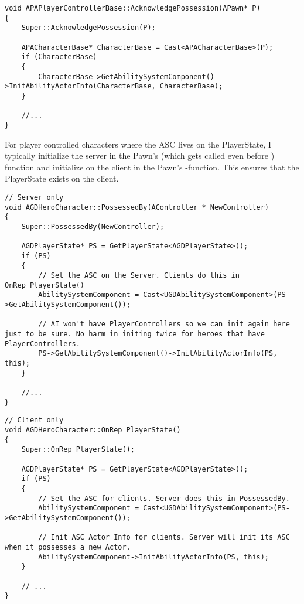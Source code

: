         \begin{lstlisting}
void APAPlayerControllerBase::AcknowledgePossession(APawn* P)
{
    Super::AcknowledgePossession(P);

    APACharacterBase* CharacterBase = Cast<APACharacterBase>(P);
    if (CharacterBase)
    {
        CharacterBase->GetAbilitySystemComponent()->InitAbilityActorInfo(CharacterBase, CharacterBase);
    }

    //...
}
        \end{lstlisting}

        For player controlled characters where the ASC lives on the PlayerState,
        I typically initialize the server in the Pawn's  (which gets
        called even before ) function and
        initialize on the client in the Pawn's -function.
        This ensures that the PlayerState exists on the client.
        \begin{lstlisting}
// Server only
void AGDHeroCharacter::PossessedBy(AController * NewController)
{
    Super::PossessedBy(NewController);

    AGDPlayerState* PS = GetPlayerState<AGDPlayerState>();
    if (PS)
    {
        // Set the ASC on the Server. Clients do this in OnRep_PlayerState()
        AbilitySystemComponent = Cast<UGDAbilitySystemComponent>(PS->GetAbilitySystemComponent());

        // AI won't have PlayerControllers so we can init again here just to be sure. No harm in initing twice for heroes that have PlayerControllers.
        PS->GetAbilitySystemComponent()->InitAbilityActorInfo(PS, this);
    }
    
    //...
}        
        \end{lstlisting}

        \begin{lstlisting}
// Client only
void AGDHeroCharacter::OnRep_PlayerState()
{
    Super::OnRep_PlayerState();

    AGDPlayerState* PS = GetPlayerState<AGDPlayerState>();
    if (PS)
    {
        // Set the ASC for clients. Server does this in PossessedBy.
        AbilitySystemComponent = Cast<UGDAbilitySystemComponent>(PS->GetAbilitySystemComponent());

        // Init ASC Actor Info for clients. Server will init its ASC when it possesses a new Actor.
        AbilitySystemComponent->InitAbilityActorInfo(PS, this);
    }

    // ...
}
        \end{lstlisting}



